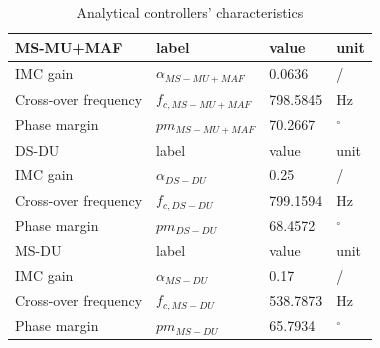 \documentclass[journal]{IEEEtran}
\begin{document}
\begin{table}[h!]
			  \caption{Analytical controllers' characteristics}
              \label{tab:an_param}
              \centering
              \begin{tabular}{llll}
                           \midrule\midrule
        MS-MU+MAF & label & value   & unit\\
        \midrule               
                  IMC gain	& $\alpha_{MS-MU+MAF}$ & 0.0636 & /\\  
                  Cross-over frequency  & $f_{c,MS-MU+MAF}$ & 798.5845 & Hz   \\
                  Phase margin  & $pm_{MS-MU+MAF}$ & 70.2667 &  $^\circ$  \\
                  \midrule\midrule
        DS-DU & label & value   & unit\\
        \midrule               
                  IMC gain	& $\alpha_{DS-DU}$ & 0.25 & /\\  
                  Cross-over frequency  & $f_{c,DS-DU}$ & 799.1594 & Hz   \\
                  Phase margin  & $pm_{DS-DU}$ & 68.4572 &  $^\circ$  \\
                  \midrule\midrule
        MS-DU & label & value   & unit\\
        \midrule               
                  IMC gain	& $\alpha_{MS-DU}$ & 0.17 & /\\  
                  Cross-over frequency  & $f_{c,MS-DU}$ & 538.7873 & Hz   \\
                  Phase margin  & $pm_{MS-DU}$ & 65.7934 &  $^\circ$  \\
                  \midrule\midrule
                                                        
              \end{tabular}
\end{table}
\end{document}
